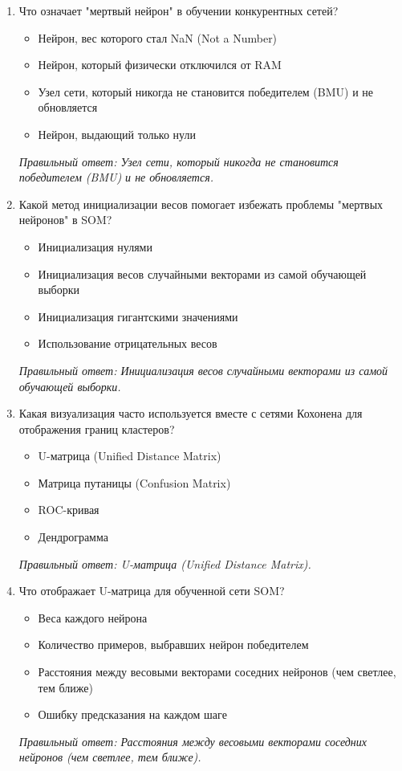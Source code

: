 \begin{enumerate}[label=\textbf{\arabic*.}, leftmargin=0pt, itemsep=1.2em]
\item Что означает "мертвый нейрон" в обучении конкурентных сетей?
\begin{itemize}[label=$\square$, leftmargin=1.5cm, itemsep=0.2em, topsep=0.3em]
\item Нейрон, вес которого стал NaN (Not a Number)
\item Нейрон, который физически отключился от RAM
\item Узел сети, который никогда не становится победителем (BMU) и не обновляется
\item Нейрон, выдающий только нули
\end{itemize}
{\small\textit{Правильный ответ: Узел сети, который никогда не становится победителем (BMU) и не обновляется.}}

\item Какой метод инициализации весов помогает избежать проблемы "мертвых нейронов" в SOM?
\begin{itemize}[label=$\square$, leftmargin=1.5cm, itemsep=0.2em, topsep=0.3em]
\item Инициализация нулями
\item Инициализация весов случайными векторами из самой обучающей выборки
\item Инициализация гигантскими значениями
\item Использование отрицательных весов
\end{itemize}
{\small\textit{Правильный ответ: Инициализация весов случайными векторами из самой обучающей выборки.}}

\item Какая визуализация часто используется вместе с сетями Кохонена для отображения границ кластеров?
\begin{itemize}[label=$\square$, leftmargin=1.5cm, itemsep=0.2em, topsep=0.3em]
\item U-матрица (Unified Distance Matrix)
\item Матрица путаницы (Confusion Matrix)
\item ROC-кривая
\item Дендрограмма
\end{itemize}
{\small\textit{Правильный ответ: U-матрица (Unified Distance Matrix).}}

\item Что отображает U-матрица для обученной сети SOM?
\begin{itemize}[label=$\square$, leftmargin=1.5cm, itemsep=0.2em, topsep=0.3em]
\item Веса каждого нейрона
\item Количество примеров, выбравших нейрон победителем
\item Расстояния между весовыми векторами соседних нейронов (чем светлее, тем ближе)
\item Ошибку предсказания на каждом шаге
\end{itemize}
{\small\textit{Правильный ответ: Расстояния между весовыми векторами соседних нейронов (чем светлее, тем ближе).}}


\end{enumerate}
